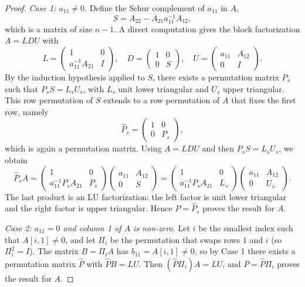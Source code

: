 \documentclass[final]{siamart1116}
\numberwithin{theorem}{section}
\begin{document}
\begin{proof}
  \emph{Case 1: $a_{11} \neq 0$.} Define the Schur complement of $a_{11}$ in $A$,
  \[
    S = A_{22} - A_{21} a_{11}^{-1} A_{12},
  \]
  which is a matrix of size $n-1$. A direct computation gives the block factorization $A = LDU$ with
  \[
    L =
    \begin{pmatrix}
      1                  & 0 \\
      a_{11}^{-1} A_{21} & I
    \end{pmatrix}, \quad
    D =
    \begin{pmatrix}
      1 & 0 \\
      0 & S
    \end{pmatrix}, \quad
    U =
    \begin{pmatrix}
      a_{11} & A_{12} \\
      0      & I
    \end{pmatrix}.
  \]
  By the induction hypothesis applied to $S$, there exists a permutation matrix $P_s$ such that $P_s S = L_s U_s$, with $L_s$ unit lower triangular and $U_s$ upper triangular. This row permutation of $S$ extends to a row permutation of $A$ that fixes the first row, namely
  \[
    \widehat{P}_s =
    \begin{pmatrix}
      1 & 0   \\
      0 & P_s
    \end{pmatrix},
  \]
  which is again a permutation matrix. Using $A = LDU$ and then $P_s S = L_s U_s$, we obtain
  \[
    \widehat{P}_s A
    =
    \begin{pmatrix}
      1                    & 0   \\
      a_{11}^{-1} P_s A_{21} & P_s
    \end{pmatrix}
    \begin{pmatrix}
      a_{11} & A_{12} \\
      0      & S
    \end{pmatrix}
    =
    \begin{pmatrix}
      1                    & 0   \\
      a_{11}^{-1} P_s A_{21} & L_s
    \end{pmatrix}
    \begin{pmatrix}
      a_{11} & A_{12} \\
      0      & U_s
    \end{pmatrix}.
  \]
  The last product is an LU factorization: the left factor is unit lower triangular and the right factor is upper triangular. Hence $P = \widehat{P}_s$ proves the result for $A$.

  \emph{Case 2: $a_{11} = 0$ and column 1 of $A$ is non-zero.} Let $i$ be the smallest index such that $A[i,1] \neq 0$, and let $\Pi_i$ be the permutation that swaps rows $1$ and $i$ (so $\Pi_i^2 = I$). The matrix $B = \Pi_i A$ has $b_{11} = A[i,1] \neq 0$, so by Case 1 there exists a permutation matrix $\widehat{P}$ with $\widehat{P} B = LU$. Then $(\widehat{P} \Pi_i) A = LU$, and $P = \widehat{P} \Pi_i$ proves the result for $A$.


\end{proof}
\end{document}
